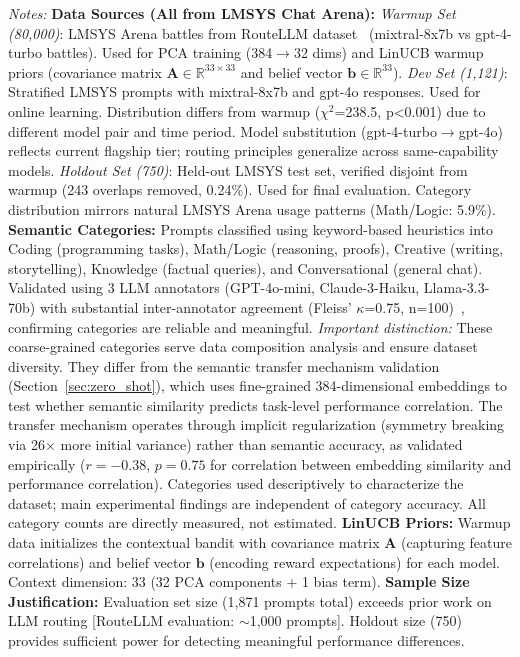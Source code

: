 \begin{table}[t]
\vspace{1em}
\footnotesize
\textit{Notes:}
\textbf{Data Sources (All from LMSYS Chat Arena):}
\textit{Warmup Set (80,000)}: LMSYS Arena battles from RouteLLM dataset~\cite{ong2024routellm} (mixtral-8x7b vs gpt-4-turbo battles). Used for PCA training (384$\rightarrow$32 dims) and LinUCB warmup priors (covariance matrix $\mathbf{A} \in \mathbb{R}^{33 \times 33}$ and belief vector $\mathbf{b} \in \mathbb{R}^{33}$).
\textit{Dev Set (1,121)}: Stratified LMSYS prompts with mixtral-8x7b and gpt-4o responses. Used for online learning. Distribution differs from warmup ($\chi^2$=238.5, p<0.001) due to different model pair and time period. Model substitution (gpt-4-turbo$\rightarrow$gpt-4o) reflects current flagship tier; routing principles generalize across same-capability models.
\textit{Holdout Set (750)}: Held-out LMSYS test set, verified disjoint from warmup (243 overlaps removed, 0.24\%). Used for final evaluation. Category distribution mirrors natural LMSYS Arena usage patterns (Math/Logic: 5.9\%).
\textbf{Semantic Categories:} Prompts classified using keyword-based heuristics into Coding (programming tasks), Math/Logic (reasoning, proofs), Creative (writing, storytelling), Knowledge (factual queries), and Conversational (general chat). Validated using 3 LLM annotators (GPT-4o-mini, Claude-3-Haiku, Llama-3.3-70b) with substantial inter-annotator agreement (Fleiss' $\kappa$=0.75, n=100)~\cite{gilardi2023chatgpt}, confirming categories are reliable and meaningful. \emph{Important distinction:} These coarse-grained categories serve data composition analysis and ensure dataset diversity. They differ from the semantic transfer mechanism validation (Section~\ref{sec:zero_shot}), which uses fine-grained 384-dimensional embeddings to test whether semantic similarity predicts task-level performance correlation. The transfer mechanism operates through implicit regularization (symmetry breaking via 26$\times$ more initial variance) rather than semantic accuracy, as validated empirically ($r=-0.38$, $p=0.75$ for correlation between embedding similarity and performance correlation). Categories used descriptively to characterize the dataset; main experimental findings are independent of category accuracy. All category counts are directly measured, not estimated.
\textbf{LinUCB Priors:} Warmup data initializes the contextual bandit with covariance matrix $\mathbf{A}$ (capturing feature correlations) and belief vector $\mathbf{b}$ (encoding reward expectations) for each model. Context dimension: 33 (32 PCA components + 1 bias term).
\textbf{Sample Size Justification:} Evaluation set size (1,871 prompts total) exceeds prior work on LLM routing [RouteLLM evaluation: $\sim$1,000 prompts]. Holdout size (750) provides sufficient power for detecting meaningful performance differences.

\end{table}
